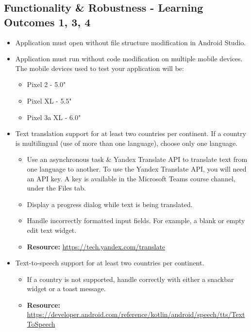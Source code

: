 \documentclass{article}
\begin{document}
\subsection*{Functionality \& Robustness - Learning Outcomes 1, 3, 4}
\begin{itemize}
	\item Application must open without file structure modification in Android Studio.
	\item Application must run without code modification on multiple mobile devices. The mobile devices used to test your application will be:
	      \begin{itemize}
	      	\item Pixel 2 - 5.0"
	      	\item Pixel XL - 5.5"
	      	\item Pixel 3a XL - 6.0"
	      \end{itemize}
	\item Text translation support for at least two countries per continent. If a country is multilingual (use of more than one language), choose only one language. 
	      \begin{itemize}
	      	\item Use an asynchronous task \& Yandex Translate API to translate text from one language to another. To use the Yandex Translate API, you will need an API key. A key is available in the Microsoft Teams course channel, under the Files tab.
	      	\item Display a progress dialog while text is being translated. 
	      	\item Handle incorrectly formatted input fields. For example, a blank or empty edit text widget.
	      	\item \textbf{Resource:} \footnotesize\href{https://tech.yandex.com/translate}{https://tech.yandex.com/translate}
	      \end{itemize}
	\item Text-to-speech support for at least two countries per continent. 
	      \begin{itemize}
	      	\item If a country is not supported, handle correctly with either a snackbar widget or a toast message.
	      	\item \textbf{Resource:} \footnotesize\href{https://developer.android.com/reference/kotlin/android/speech/tts/TextToSpeech}{https://developer.android.com/reference/kotlin/android/speech/tts/TextToSpeech} 
	      \end{itemize}

\end{itemize}
\end{document}
